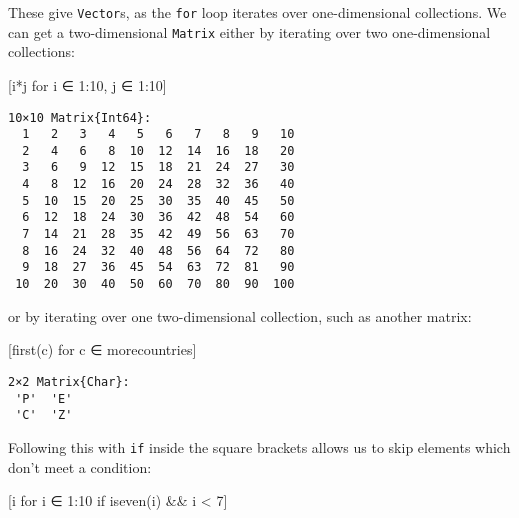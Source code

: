 \documentclass[
  letterpaper,
  DIV=11,
  numbers=noendperiod]{scrreprt}
\newenvironment{Shaded}{\begin{snugshade}}{\end{snugshade}}
\newcommand{\FloatTok}[1]{\textcolor[rgb]{0.68,0.00,0.00}{#1}}
\newcommand{\FunctionTok}[1]{\textcolor[rgb]{0.28,0.35,0.67}{#1}}
\newcommand{\NormalTok}[1]{\textcolor[rgb]{0.00,0.23,0.31}{#1}}
\newcommand{\OperatorTok}[1]{\textcolor[rgb]{0.37,0.37,0.37}{#1}}
\begin{document}
These give \texttt{Vector}s, as the \texttt{for} loop iterates over
one-dimensional collections. We can get a two-dimensional
\texttt{Matrix} either by iterating over two one-dimensional
collections:

\begin{Shaded}
\begin{Highlighting}[]
\NormalTok{[i}\OperatorTok{*}\NormalTok{j for i }\OperatorTok{∈} \FloatTok{1}\OperatorTok{:}\FloatTok{10}\NormalTok{, j }\OperatorTok{∈} \FloatTok{1}\OperatorTok{:}\FloatTok{10}\NormalTok{]}
\end{Highlighting}
\end{Shaded}

\begin{verbatim}
10×10 Matrix{Int64}:
  1   2   3   4   5   6   7   8   9   10
  2   4   6   8  10  12  14  16  18   20
  3   6   9  12  15  18  21  24  27   30
  4   8  12  16  20  24  28  32  36   40
  5  10  15  20  25  30  35  40  45   50
  6  12  18  24  30  36  42  48  54   60
  7  14  21  28  35  42  49  56  63   70
  8  16  24  32  40  48  56  64  72   80
  9  18  27  36  45  54  63  72  81   90
 10  20  30  40  50  60  70  80  90  100
\end{verbatim}

or by iterating over one two-dimensional collection, such as another
matrix:

\begin{Shaded}
\begin{Highlighting}[]
\NormalTok{[}\FunctionTok{first}\NormalTok{(c) for c }\OperatorTok{∈}\NormalTok{ morecountries]}
\end{Highlighting}
\end{Shaded}

\begin{verbatim}
2×2 Matrix{Char}:
 'P'  'E'
 'C'  'Z'
\end{verbatim}

Following this with \texttt{if} inside the square brackets allows us to
skip elements which don't meet a condition:

\begin{Shaded}
\begin{Highlighting}[]
\NormalTok{[i for i }\OperatorTok{∈} \FloatTok{1}\OperatorTok{:}\FloatTok{10}\NormalTok{ if }\FunctionTok{iseven}\NormalTok{(i) }\OperatorTok{\&\&}\NormalTok{ i }\OperatorTok{\textless{}} \FloatTok{7}\NormalTok{]}
\end{Highlighting}
\end{Shaded}
\end{document}
